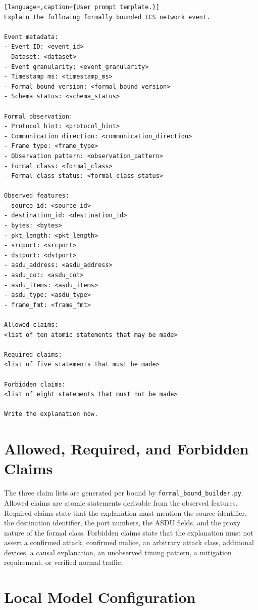 \begin{lstlisting}[language=,caption={User prompt template.}]
Explain the following formally bounded ICS network event.

Event metadata:
- Event ID: <event_id>
- Dataset: <dataset>
- Event granularity: <event_granularity>
- Timestamp ms: <timestamp_ms>
- Formal bound version: <formal_bound_version>
- Schema status: <schema_status>

Formal observation:
- Protocol hint: <protocol_hint>
- Communication direction: <communication_direction>
- Frame type: <frame_type>
- Observation pattern: <observation_pattern>
- Formal class: <formal_class>
- Formal class status: <formal_class_status>

Observed features:
- source_id: <source_id>
- destination_id: <destination_id>
- bytes: <bytes>
- pkt_length: <pkt_length>
- srcport: <srcport>
- dstport: <dstport>
- asdu_address: <asdu_address>
- asdu_cot: <asdu_cot>
- asdu_items: <asdu_items>
- asdu_type: <asdu_type>
- frame_fmt: <frame_fmt>

Allowed claims:
<list of ten atomic statements that may be made>

Required claims:
<list of five statements that must be made>

Forbidden claims:
<list of eight statements that must not be made>

Write the explanation now.
\end{lstlisting}

\section{Allowed, Required, and Forbidden Claims}
\label{sec:claim-lists}

The three claim lists are generated per bound by
\texttt{formal\_bound\_builder.py}. Allowed claims are atomic statements
derivable from the observed features. Required claims state that the
explanation must mention the source identifier, the destination identifier,
the port numbers, the ASDU fields, and the proxy nature of the formal class.
Forbidden claims state that the explanation must not assert a confirmed
attack, confirmed malice, an arbitrary attack class, additional devices, a
causal explanation, an unobserved timing pattern, a mitigation requirement,
or verified normal traffic.

\section{Local Model Configuration}
\label{sec:local-model-config}

